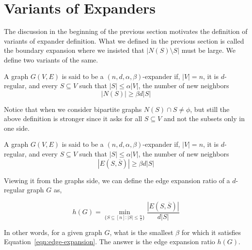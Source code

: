 \section{Variants of Expanders}
The discussion in the beginning of the previous section motivates the definition of variants of expander definition. What we defined in the previous section is called the boundary expansion where we insisted that $|N(S)\setminus S|$ must be large. We define two variants of the same.
\begin{definition}
A graph $G(V,E)$ is said to be a $(n,d,\alpha,\beta)$-expander if, $|V|=n$, it is $d$-regular, and every $S \subseteq V$ such that $|S| \le \alpha|V|$, the number of new neighbors $$|N(S)| \ge \beta d|S|$$
\end{definition}
Notice that when we consider bipartite graphs $N(S) \cap S \ne \phi$, but still the above definition is stronger since it asks for all $S \subseteq V$ and not the subsets only in one side.
\begin{definition}
A graph $G(V,E)$ is said to be a $(n,d,\alpha,\beta)$-expander if, $|V|=n$, it is $d$-regular, and every $S \subseteq V$ such that $|S| \le \alpha|V|$, the number of new neighbors
\begin{equation}
|E(S,\overline{S})| \ge \beta d|S|
\label{eqn:edge-expansion}
\end{equation}
\end{definition}

Viewing it from the graphs side, we can define the edge expansion ratio of a $d$-regular graph $G$ as,

$$h(G) = \min_{\{S \subseteq [n] :  
|S| \le \frac{n}{2}\}}\frac{|E(S,\overline{S})|}{d|S|}$$

In other words, for a given graph $G$, what is the smallest $\beta$ for which it satisfies Equation~\ref{eqn:edge-expansion}. The answer is the edge expansion ratio $h(G)$.

